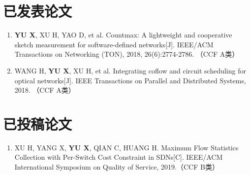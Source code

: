 
\begin{publications}

\section*{已发表论文}

\begin{enumerate}
\item \textbf{YU X}, XU H, YAO D, et al. Countmax: A lightweight and cooperative sketch measurement for software-defined networks[J]. IEEE/ACM Transactions on Networking (TON), 2018, 26(6):2774-2786. （CCF A类）
\item WANG H, \textbf{YU X}, XU H, et al. Integrating coflow and circuit scheduling for optical networks[J]. IEEE Transactions on Parallel and Distributed Systems, 2018. （CCF A类）
\end{enumerate}

\section*{已投稿论文}

\begin{enumerate}
\item XU H, YANG X, \textbf{YU X}, QIAN C, HUANG H. Maximum Flow Statistics Collection with Per-Switch Cost Constraint in SDNs[C]. IEEE/ACM International Symposium on Quality of Service, 2019.（CCF B类）
\end{enumerate}
\end{publications}
